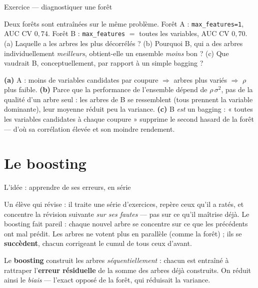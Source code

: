 \documentclass[aspectratio=169,11pt]{beamer}
\begin{document}
\begin{frame}{Exercice — diagnostiquer une forêt}
\begin{ucadrec}[Énoncé]
{\small Deux forêts sont entraînées sur le même problème. Forêt A : \texttt{max\_features=1}, AUC CV $0{,}74$. Forêt B : \texttt{max\_features} $=$ toutes les variables, AUC CV $0{,}70$. (a) Laquelle a les arbres les plus décorrélés ? (b) Pourquoi B, qui a des arbres individuellement \emph{meilleurs}, obtient-elle un ensemble \emph{moins} bon ? (c) Que vaudrait B, conceptuellement, par rapport à un simple bagging ?}
\end{ucadrec}
\pause
\begin{ucadex}[Correction]
{\small \textbf{(a)} A : moins de variables candidates par coupure $\Rightarrow$ arbres plus variés $\Rightarrow$ $\rho$ plus faible. \textbf{(b)} Parce que la performance de l'ensemble dépend de $\rho\,\sigma^2$, pas de la qualité d'un arbre seul : les arbres de B se ressemblent (tous prennent la variable dominante), leur moyenne réduit peu la variance. \textbf{(c)} B \emph{est} un bagging : « toutes les variables candidates à chaque coupure » supprime le second hasard de la forêt — d'où sa corrélation élevée et son moindre rendement.}
\end{ucadex}
\end{frame}

\section{Le boosting}

\begin{frame}{L'idée : apprendre de ses erreurs, en série}
\begin{ucadfront}[Analogie]
{\small Un élève qui révise : il traite une série d'exercices, repère ceux qu'il a ratés, et concentre la révision suivante \emph{sur ses fautes} — pas sur ce qu'il maîtrise déjà. Le boosting fait pareil : chaque nouvel arbre se concentre sur ce que les précédents ont mal prédit. Les arbres ne votent plus en parallèle (comme la forêt) ; ils se \textbf{succèdent}, chacun corrigeant le cumul de tous ceux d'avant.}
\end{ucadfront}
\begin{ucaddef}
{\small Le \textbf{boosting} construit les arbres \emph{séquentiellement} : chacun est entraîné à rattraper l'\textbf{erreur résiduelle} de la somme des arbres déjà construits. On réduit ainsi le \emph{biais} — l'exact opposé de la forêt, qui réduisait la variance.}
\end{ucaddef}
\end{frame}
\end{document}
